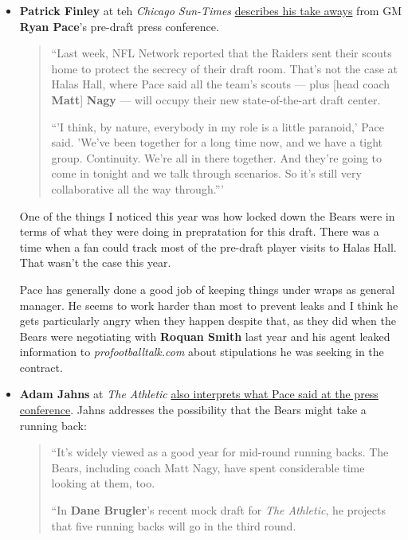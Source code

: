 \documentclass[11pt]{article}
\author{Tom Shannon}
\date{\today}
\title{}
\begin{document}
\begin{itemize}
\item \textbf{Patrick Finley} at teh \textit{Chicago Sun-Times} \href{https://chicago.suntimes.com/sports/nfl-draft-2019-bears-ryan-pace-five-things-we-learned/}{describes his take aways} from GM  \textbf{Ryan Pace}'s pre-draft press conference.

  \begin{quote}
    ``Last week, NFL Network reported that the Raiders sent their scouts home to protect the secrecy of their draft room. That’s not the case at Halas Hall, where Pace said all the team’s scouts — plus [head coach \textbf{Matt}] \textbf{Nagy} — will occupy their new state-of-the-art draft center.

``'I think, by nature, everybody in my role is a little paranoid,' Pace said. 'We’ve been together for a long time now, and we have a tight group. Continuity. We’re all in there together. And they’re going to come in tonight and we talk through scenarios. So it’s still very collaborative all the way through.'''
\end{quote}

One of the things I noticed this year was how locked down the Bears were in terms of what they were doing in prepratation for this draft.  There was a time when a fan could track most of the pre-draft player visits to Halas Hall.  That wasn't the case this year.

Pace has generally done a good job of keeping things under wraps as general manager.  He seems to work harder than most to prevent leaks and I think he gets particularly angry when they happen despite that, as they did when the Bears were negotiating with \textbf{Roquan Smith} last year and his agent leaked information to \textit{profootballtalk.com} about stipulations he was seeking in the contract.

\item \textbf{Adam Jahns} at \textit{The Athletic} \href{https://theathletic.com/941781/2019/04/23/making-sense-of-what-ryan-pace-said-in-his-annual-pre-draft-press-conference/?redirected=1}{also interprets what Pace said at the press conference}.  Jahns addresses the possibility that the Bears might take a running back:

  \begin{quote}
    ``It’s widely viewed as a good year for mid-round running backs. The Bears, including coach Matt Nagy, have spent considerable time looking at them, too.

``In \textbf{Dane Brugler}’s recent mock draft  for \textit{The Athletic}, he projects that five running backs will go in the third round.


\end{quote}
\end{itemize}
\end{document}
